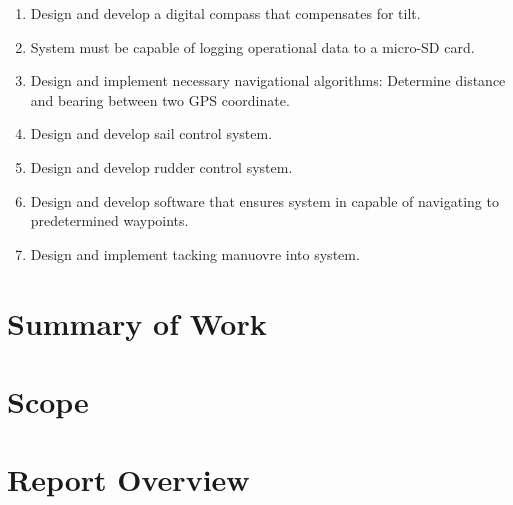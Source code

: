 \begin{enumerate}
  \item Design and develop a digital compass that compensates for tilt.
  \item System must be capable of logging operational data to a micro-SD card.
  \item Design and implement necessary navigational algorithms: Determine distance and bearing between two GPS coordinate.
  \item Design and develop sail control system.
  \item Design and develop rudder control system.
  \item Design and develop software that ensures system in capable of navigating to predetermined waypoints.
  \item Design and implement tacking manuovre into system.
\end{enumerate}

\section{Summary of Work}

\section{Scope}

\section{Report Overview}







